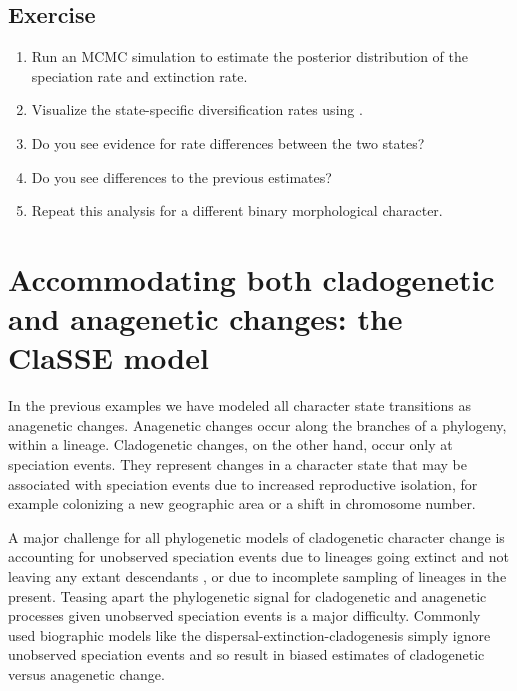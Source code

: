 


\subsection{Exercise}

\begin{enumerate}
\item Run an MCMC simulation to estimate the posterior distribution of the speciation rate and extinction rate.
\item Visualize the state-specific diversification rates using \R.
\item Do you see evidence for rate differences between the two states?
\item Do you see differences to the previous \BiSSE estimates?
\item Repeat this analysis for a different binary morphological character.
\end{enumerate}


\newpage
\section{Accommodating both cladogenetic and anagenetic changes: the ClaSSE model}\label{sec:ClaSSE}

In the previous examples we have modeled all character state transitions
as anagenetic changes.
Anagenetic changes occur along the branches of a phylogeny, within a lineage.
Cladogenetic changes, on the other hand, occur only at speciation events.
They represent changes in a character state that may be associated with speciation events
due to increased reproductive isolation,
for example colonizing a new geographic area or a shift in chromosome number.

A major challenge for all phylogenetic models of cladogenetic character change
is accounting
for unobserved speciation events due to lineages going extinct
and not leaving any extant descendants \citep{Bokma2002},
or due to incomplete sampling of lineages in the present.
Teasing apart
the phylogenetic signal for cladogenetic and anagenetic processes given
unobserved speciation events is a major difficulty.
Commonly used biographic models like the
dispersal-extinction-cladogenesis \citep[DEC;][]{Ree2008} simply ignore
unobserved speciation events and so result in biased
estimates of cladogenetic versus anagenetic change.

